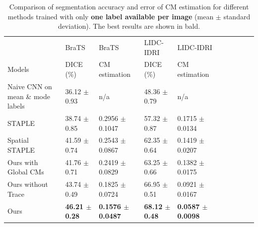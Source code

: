 \begin{table}[H]
	\center
	\scriptsize
	\begin{tabular}{@{}llllllllll}
		\hline
		 & BraTS & BraTS  & LIDC-IDRI  & LIDC-IDRI  \\
		Models & DICE (\%) & CM estimation & DICE (\%) & CM estimation \\
		  
		\hline	
		Naive CNN on mean \& mode labels& 36.12 $\pm$ 0.93  &  n/a & 48.36 $\pm$ 0.79   &  n/a  \\
		STAPLE \cite{warfield2004simultaneous}& 38.74 $\pm$ 0.85  & 0.2956 $\pm$ 0.1047  & 57.32 $\pm$ 0.87  & 0.1715 $\pm$ 0.0134     \\ 
		Spatial STAPLE \cite{asman2012formulating} & 41.59 $\pm$ 0.74  & 0.2543 $\pm$ 0.0867  & 62.35 $\pm$ 0.64  & 0.1419 $\pm$ 0.0207    \\
 		Ours with Global CMs  & 41.76 $\pm$ 0.71  & 0.2419 $\pm$ 0.0829   & 63.25 $\pm$ 0.66  & 0.1382 $\pm$ 0.0175    \\
		Ours without Trace & 43.74 $\pm$ 0.49   & 0.1825 $\pm$ 0.0724   & 66.95 $\pm$ 0.51  & 0.0921 $\pm$ 0.0167   \\
		Ours & \textbf{46.21 $\pm$ 0.28}   & \textbf{0.1576 $\pm$ 0.0487 }  & \textbf{68.12 $\pm$ 0.48}  & \textbf{0.0587 $\pm$ 0.0098   } \\
		\hline
	\end{tabular}%
		\vspace{1mm}
    \caption{\footnotesize Comparison of segmentation accuracy and error of CM estimation for different methods trained with only \textbf{one label available per image} (mean $\pm$ standard deviation). The best results are shown in bald.}
    \label{singlelabebrats}
\end{table}



